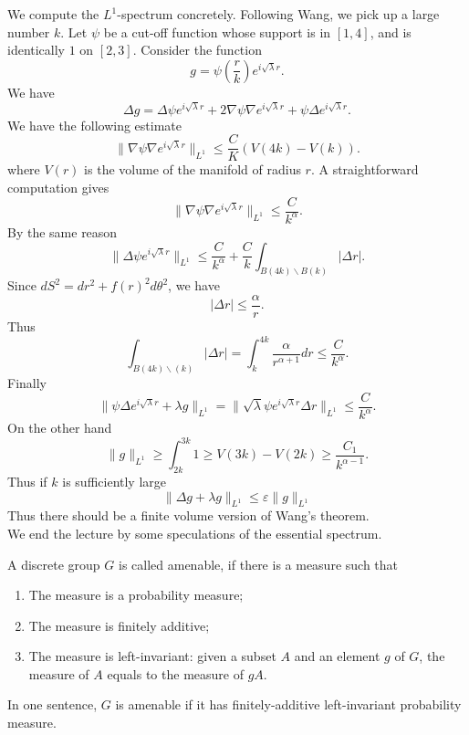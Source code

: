 We compute the $L^1$-spectrum concretely. Following Wang, we pick up a large
number $k$. Let $\psi$ be a cut-off function whose support is in $[1,4]$, and
is identically $1$ on $[2,3]$. Consider the function
\[
g = \psi(\frac{r}{k}) e^{i\sqrt{\lambda}r}.
\]
We have
\[
\Delta g = \Delta \psi e^{i\sqrt{\lambda}r} + 2\nabla\psi\nabla 
e^{i\sqrt{\lambda}r} + \psi\Delta e^{i\sqrt{\lambda}r}.
\]
We have the following estimate
\[
\|\nabla\psi\nabla e^{i\sqrt{\lambda}r}\|_{L^1} \leqslant \frac{C}{K}
(V(4k) - V(k)).
\]
where $V(r)$ is the volume of the manifold of radius $r$. A straightforward
computation gives
\[
\|\nabla\psi\nabla e^{i\sqrt{\lambda}r}\|_{L^1} \leqslant \frac{C}{k^\alpha}.
\]
By the same reason
\[
\|\Delta\psi e^{i\sqrt{\lambda}r}\|_{L^1} \leqslant \frac{C}{k^\alpha} +
\frac{C}{k}\int_{B(4k)\backslash B(k)}|\Delta r|.
\]
Since $dS^2 = dr^2 + f(r)^2 d\theta^2$, we have
\[
|\Delta r| \leqslant \frac{\alpha}{r}.
\]
Thus
\[
\int_{B(4k)\backslash(k)}|\Delta r| = \int_k^{4k}\frac{\alpha}{r^{\alpha+1}}dr
\leqslant \frac{C}{k^\alpha}.
\]
Finally
\[
\|\psi\Delta e^{i\sqrt{\lambda}r} + \lambda g\|_{L^1} =
\|\sqrt{\lambda}\psi e^{i\sqrt{\lambda}r} \Delta r\|_{L^1} \leqslant
\frac{C}{k^\alpha}.
\]
On the other hand
\[
\|g\|_{L^1} \geqslant \int_{2k}^{3k} 1 \geqslant V(3k) - V(2k) \geqslant
\frac{C_1}{k^{\alpha-1}}.
\]
Thus if $k$ is sufficiently large
\[
\|\Delta g + \lambda g\|_{L^1} \leqslant \varepsilon\|g\|_{L^1}
\]
Thus there should be a finite volume version of Wang's theorem.
\\

We end the lecture by some speculations of the essential spectrum.
\\

\begin{definition}
A discrete group $G$ is called amenable, if there is a measure such that
\begin{enumerate}
\item The measure is a probability measure;
\item The measure is finitely additive;
\item The measure is left-invariant: given a subset $A$ and an element $g$ of
$G$, the measure of $A$ equals to the measure of $gA$.
\end{enumerate}
\end{definition}

In one sentence, $G$ is amenable if it has finitely-additive left-invariant
probability measure.
\\

